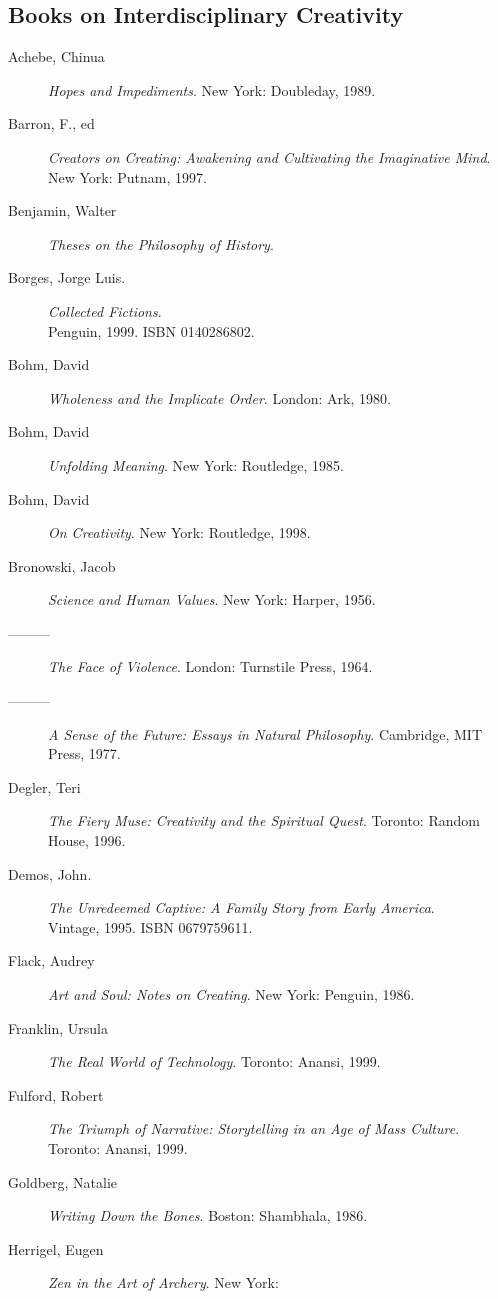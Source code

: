 \documentclass[letterpaper,10pt,headsepline]{scrreprt}
\begin{document}
\subsection{Books on Interdisciplinary Creativity}
\begin{description}
\item [Achebe, Chinua] \textit{Hopes and Impediments}. New York:
  Doubleday, 1989.
\item [Barron, F., ed] \textit{Creators on Creating: Awakening and
    Cultivating the Imaginative Mind}. New York: Putnam, 1997.
\item [Benjamin, Walter] \textit{Theses on the Philosophy of History}.
\item [Borges, Jorge Luis.] \textit{Collected Fictions}. \\Penguin,
  1999. \textsc{ISBN 0140286802}.
\item [Bohm, David] \textit{Wholeness and the Implicate Order}.
  London: Ark, 1980.
\item [Bohm, David] \textit{Unfolding Meaning}. New York: Routledge,
  1985.
\item [Bohm, David] \textit{On Creativity}. New York: Routledge, 1998.
\item [Bronowski, Jacob] \textit{Science and Human Values}. New York:
  Harper, 1956.
\item [---------] \textit{The Face of Violence}. London: Turnstile
  Press, 1964.
\item [---------] \textit{A Sense of the Future: Essays in Natural
    Philosophy}. Cambridge, MIT Press, 1977.
\item [Degler, Teri] \textit{The Fiery Muse: Creativity and the
    Spiritual Quest}. Toronto: Random House, 1996.
\item [Demos, John.] \textit{The Unredeemed Captive: A Family Story
    from Early America}. \\Vintage, 1995. \textsc{ISBN 0679759611}.
\item [Flack, Audrey] \textit{Art and Soul: Notes on Creating}. New
  York: Penguin, 1986.
\item [Franklin, Ursula] \textit{The Real World of Technology}.
  Toronto: Anansi, 1999.
\item [Fulford, Robert] \textit{The Triumph of Narrative: Storytelling
    in an Age of Mass Culture}. Toronto: Anansi, 1999.
\item [Goldberg, Natalie] \textit{Writing Down the Bones}. Boston:
  Shambhala, 1986.
\item [Herrigel, Eugen] \textit{Zen in the Art of Archery}. New York:

\end{description}
\end{document}

